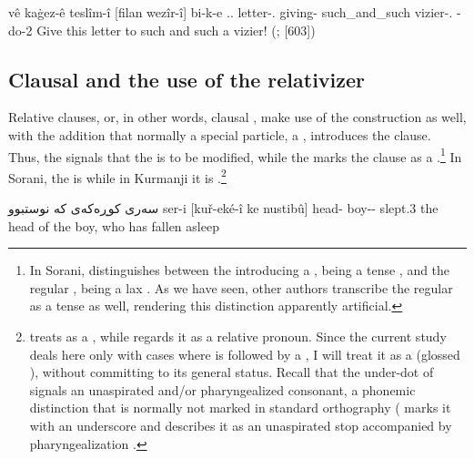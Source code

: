 {vê kaġez-ê teslîm-î [filan wezîr-î] bi-k-e}
{\dem.\near.\obl{} letter-\obl.\fem{} giving-\ez{} such\_and\_such vizier-\obl.\masc{} \subj-do-2\sg}
{Give this letter to such and such a vizier!}
{}{(\cite[161]{MacKenzie}; \cite[274]{MacKenzieTexts} {[603]})}















\subsection{Clausal \secns and the use of the relativizer} \label{ss:cst_ez_clausal}

Relative clauses, or, in other words, clausal \secns, make use of the \ez* construction as well, with the addition that normally a special particle, a , introduces the clause. Thus, the \ez* signals that the \prim is to be modified, while the \rel* marks the clause as a \secn.\footnote{In Sorani, \citeauthor{ThackstonSorani} distinguishes between the \ez* introducing a , being a tense , and the regular \ez*, being a lax . As we have seen, other authors transcribe the regular \ez* as a tense  as well, rendering this distinction apparently artificial.} In Sorani, the \rel* is  while in Kurmanji it is .\footnote{\citet{HaigLinker} treats   as a , while \citet{ThackstonKurmanji} regards it as a relative pronoun. Since the current study deals here only with cases where  is followed by a , I will treat it as a  (glossed \rel), without committing to its general status. Recall that the under-dot of  signals an unaspirated and/or pharyngealized consonant, a phonemic distinction that is normally not marked in standard \Kur orthography (\citeauthor[4]{ThackstonKurmanji} marks it with an underscore and describes it as an unaspirated stop accompanied by pharyngealization \phonetic[kˁ].} 

{سەری كوڕەكەی كە نوستبوو}
{ser-i [kuř-eké-î ke nustibû]}
{head-\ez{} boy--\ez{} \rel{} slept.3\masc}
{the head of the boy, who has fallen asleep}
{\citep[73]{ThackstonSorani}}

